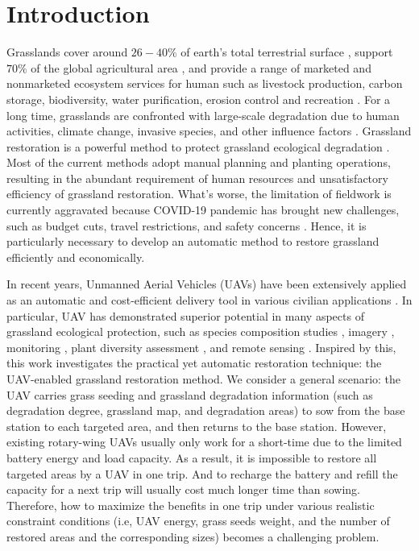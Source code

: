 \documentclass[preprint,5pt]{elsarticle}
\begin{document}
\section{Introduction}
Grasslands cover around $26-40\%$ of earth's total terrestrial surface \cite{chapin2013global}, support $70\%$ of the global agricultural area \cite{reynolds2005grasslands}, and provide a range of marketed and nonmarketed ecosystem services for human \cite{reinermann2020remote} such as livestock production, carbon storage, biodiversity, water purification, erosion control and recreation \cite{dass2018grasslands,gibson2009grasses}. For a long time, grasslands are confronted with large-scale degradation due to human activities, climate change, invasive species, and other influence factors \cite{steffen2015planetary}. Grassland restoration is a powerful method to protect grassland ecological degradation \cite{torok2021present}. Most of the current methods adopt manual planning and planting operations, resulting in the abundant requirement of human resources and unsatisfactory efficiency of grassland restoration. What's worse, the limitation of fieldwork is currently aggravated because COVID-19 pandemic has brought new challenges, such as budget cuts, travel restrictions, and safety concerns \cite{mohan2021uav}. Hence, it is particularly necessary to develop an automatic method to restore grassland efficiently and economically.

In recent years, Unmanned Aerial Vehicles (UAVs) have been extensively applied as an automatic and cost-efficient delivery tool in various civilian applications \cite{yang2020adaptive}. In particular, UAV has demonstrated superior potential in many aspects of grassland ecological protection, such as species composition studies \cite{sun2018unmanned}, imagery \cite{blackburn2021monitoring}, monitoring \cite{buters2019seed}, plant diversity assessment \cite{libran2020unmanned}, and remote sensing \cite{xiang2019mini}. Inspired by this, this work investigates the practical yet automatic restoration technique: the UAV-enabled grassland restoration method. We consider a general scenario: the UAV carries grass seeding and grassland degradation information (such as degradation degree, grassland map, and degradation areas) to sow from the base station to each targeted area, and then returns to the base station. However, existing rotary-wing UAVs usually only work for a short-time due to the limited battery energy and load capacity. As a result, it is impossible to restore all targeted areas by a UAV in one trip. And to recharge the battery and refill the capacity for a next trip will usually cost much longer time than sowing. Therefore, how to maximize the benefits in one trip under various realistic constraint conditions (i.e, UAV energy, grass seeds weight, and the number of restored areas and the corresponding sizes) becomes a challenging problem.
\end{document}
